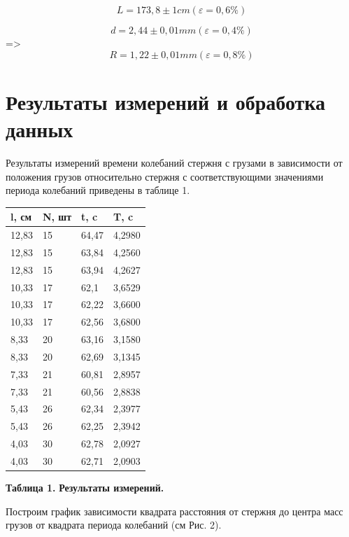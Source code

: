 \[L = 173,8 \pm 1 cm (\varepsilon = 0,6 \%)\]

\[d = 2,44 \pm 0,01 mm (\varepsilon = 0,4\%)\]
=>
\[R = 1,22 \pm 0,01 mm (\varepsilon = 0,8\%)\]



\section{Результаты измерений и обработка данных}

    Результаты измерений времени колебаний стержня с грузами в зависимости от положения грузов относительно стержня с соответствующими значениями периода колебаний приведены в таблице 1.
    
\newpage
\begin{table}[h!]
\centering
\begin{tabular}{|l|l|l|l|}
\hline
l, см & N, шт & t, c  & T, c   \\ \hline
12,83 & 15    & 64,47 & 4,2980 \\ \hline
12,83 & 15    & 63,84 & 4,2560 \\ \hline
12,83 & 15    & 63,94 & 4,2627 \\ \hline
10,33 & 17    & 62,1  & 3,6529 \\ \hline
10,33 & 17    & 62,22 & 3,6600 \\ \hline
10,33 & 17    & 62,56 & 3,6800 \\ \hline
8,33  & 20    & 63,16 & 3,1580 \\ \hline
8,33  & 20    & 62,69 & 3,1345 \\ \hline
7,33  & 21    & 60,81 & 2,8957 \\ \hline
7,33  & 21    & 60,56 & 2,8838 \\ \hline
5,43  & 26    & 62,34 & 2,3977 \\ \hline
5,43  & 26    & 62,25 & 2,3942 \\ \hline
4,03  & 30    & 62,78 & 2,0927 \\ \hline
4,03  & 30    & 62,71 & 2,0903 \\ \hline
\end{tabular}
\end{table}
\begin{flushright}
{\scriptsize \textbf{Таблица 1.} \textbf {Результаты измерений.}}
\end{flushright}


    Построим график зависимости квадрата расстояния от стержня до центра масс грузов от квадрата периода колебаний (см Рис. 2).
    
